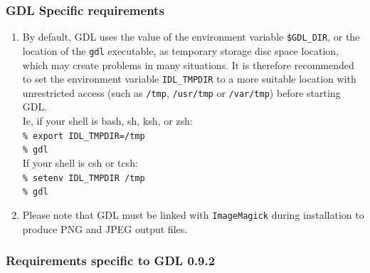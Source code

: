 \documentclass[12pt,twoside]{article}
\begin{document}
\subsubsection*{GDL Specific requirements}
\begin{enumerate}
\item 
By default, GDL uses the value of the environment variable {\tt \$GDL\_DIR}, or the location of the {\tt gdl} executable, 
as temporary storage disc space location, which may create problems in many situations.
It is therefore recommended to set the environment variable {\tt IDL\_TMPDIR} to a more suitable location
with unrestricted access
 (such as {\tt /tmp}, {\tt /usr/tmp} or {\tt /var/tmp}) before starting GDL.\\
Ie, if your shell is bash, sh, ksh, or zsh:\\
{\tt \% export IDL\_TMPDIR=/tmp}\hfill\\
{\tt \% gdl}\hfill\\
If your shell is csh or tcsh:\\
{\tt \% setenv IDL\_TMPDIR /tmp}\hfill\\
{\tt \% gdl}\hfill\\



\item
Please note that GDL must be linked with {\tt ImageMagick} during installation to produce PNG and JPEG
output files.

\end{enumerate}

\subsubsection*{Requirements specific to GDL 0.9.2}
\end{document}
